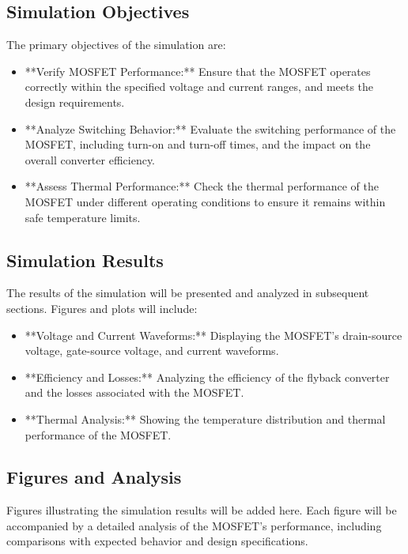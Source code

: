\documentclass{article}
\begin{document}
\subsection{Simulation Objectives}
The primary objectives of the simulation are:

\begin{itemize}
    \item **Verify MOSFET Performance:** Ensure that the MOSFET operates correctly within the specified voltage and current ranges, and meets the design requirements.
    \item **Analyze Switching Behavior:** Evaluate the switching performance of the MOSFET, including turn-on and turn-off times, and the impact on the overall converter efficiency.
    \item **Assess Thermal Performance:** Check the thermal performance of the MOSFET under different operating conditions to ensure it remains within safe temperature limits.
\end{itemize}

\subsection{Simulation Results}
The results of the simulation will be presented and analyzed in subsequent sections. Figures and plots will include:

\begin{itemize}
    \item **Voltage and Current Waveforms:** Displaying the MOSFET's drain-source voltage, gate-source voltage, and current waveforms.
    \item **Efficiency and Losses:** Analyzing the efficiency of the flyback converter and the losses associated with the MOSFET.
    \item **Thermal Analysis:** Showing the temperature distribution and thermal performance of the MOSFET.
\end{itemize}

\subsection{Figures and Analysis}
Figures illustrating the simulation results will be added here. Each figure will be accompanied by a detailed analysis of the MOSFET's performance, including comparisons with expected behavior and design specifications.

\end{document}
